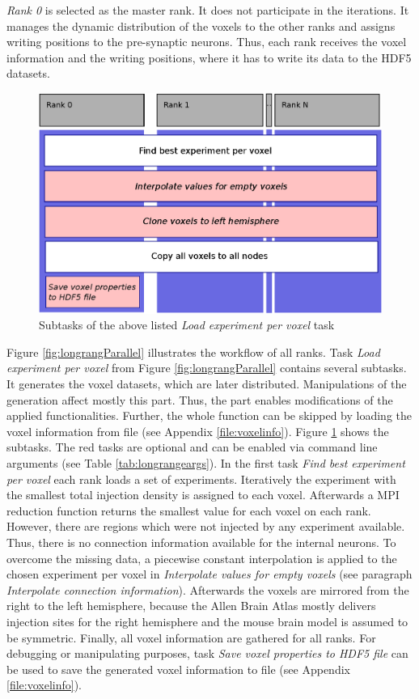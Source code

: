 \emph{Rank 0} is selected as the master rank. It does not participate in the iterations.
It manages the dynamic distribution of the voxels to the other ranks and 
assigns writing positions to the pre-synaptic neurons. Thus, each rank receives the 
voxel information and the writing positions,
where it has to write its data to the HDF5 datasets.
\begin{figure}[ht!]
\centering
\includegraphics[scale=0.5]{pictures/longRange_BestExp_parallelAlg.eps}
\caption{Subtasks of the above listed \emph{Load experiment per voxel} task}
\label{fig:longrangeLEPV}
\end{figure}

Figure \ref{fig:longrangParallel} illustrates the workflow of all ranks.
Task \emph{Load experiment per voxel} from Figure \ref{fig:longrangParallel} contains several subtasks.
It generates the voxel datasets, which are later distributed.
Manipulations of the generation affect mostly this part.
Thus, the part enables modifications of the applied functionalities. 
Further, the whole function can be skipped by loading the voxel information from file (see Appendix \ref{file:voxelinfo}).
Figure \ref{fig:longrangeLEPV} shows the subtasks.
The red tasks are optional and can be enabled via command line arguments (see Table \ref{tab:longrangeargs}).
In the first task \emph{Find best experiment per voxel} each rank loads a set of experiments.
Iteratively the experiment with the smallest total injection density is assigned to each voxel.
Afterwards a MPI reduction function returns the smallest value for each voxel on
each rank.
However, there are regions which were not injected by any experiment available.
Thus, there is no connection information available for the internal neurons.
To overcome the missing data, a piecewise constant interpolation is applied to the chosen experiment per voxel
in \emph{Interpolate values for empty voxels} (see paragraph \emph{Interpolate connection information}).
Afterwards the voxels are mirrored from the right to the left hemisphere, because the
Allen Brain Atlas mostly delivers injection sites for the right hemisphere and
the mouse brain model is assumed to be symmetric.
Finally, all voxel information are gathered for all ranks.
For debugging or manipulating purposes, task \emph{Save voxel properties to HDF5 file} can be used
to save the generated voxel information to file (see Appendix \ref{file:voxelinfo}).

